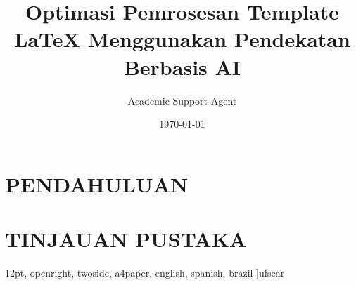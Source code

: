 \documentclass{ufscar}
\title{Optimasi Pemrosesan Template LaTeX Menggunakan Pendekatan Berbasis AI}
\author{Academic Support Agent}
\date{\today}
\begin{document}
\maketitle

\begin{abstract}

\end{abstract}

\chapter{PENDAHULUAN}


\chapter{TINJAUAN PUSTAKA}


	12pt,				%
	openright,			%
	twoside,			%
	a4paper,			%
	english,			%
	spanish,			%
	brazil				%
	]{ufscar}
	
\usepackage[utf8]{inputenc}
\usepackage{relsize}
\usepackage{lmodern}			%
\usepackage[T1]{fontenc}		%
\usepackage{indentfirst}		%
\usepackage{color}				%
\usepackage{graphicx}			%
\usepackage{microtype} 			%
\usepackage{pdfpages}

\usepackage[brazilian,hyperpageref]{backref}	 %
\usepackage[alf]{abntex2cite}	%


\usepackage{amsmath}
\usepackage{multirow}
\usepackage[flushleft]{threeparttable}
\usepackage{subcaption}
\usepackage{lscape}
\usepackage{longtable}
\usepackage{tabularx}
\usepackage{array}
\usepackage[table]{xcolor}
\end{document}

